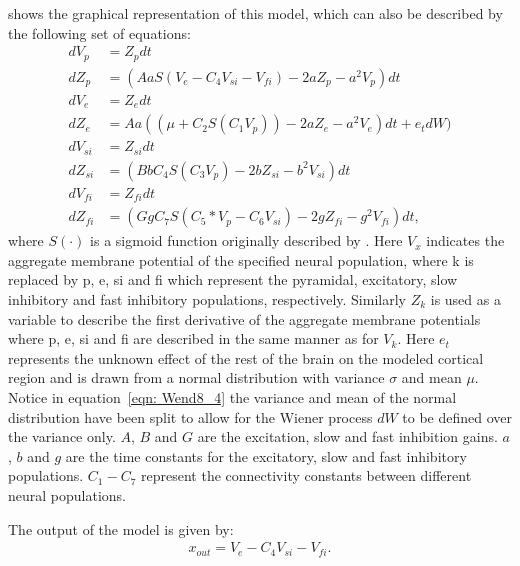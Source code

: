  shows the graphical representation of this model, which can also be described by the following set of equations: \begin{align}
dV_{p}&= Z_{p}dt\\
dZ_{p}&=(AaS(V_{e}-C_{4}V_{si}-V_{fi})-2aZ_{p}-a^{2}V_{p})dt\\
dV_{e}&= Z_{e}dt\\
\label{eqn: Wend8_4}
dZ_{e}&=Aa((\mu +C_{2}S(C_{1}V_{p}))-2aZ_{e}-a^{2}V_{e})dt + e_{t}dW)\\
dV_{si}&= Z_{si}dt\\
dZ_{si}&=(BbC_{4}S(C_{3}V_{p})-2bZ_{si}-b^{2}V_{si})dt\\
dV_{fi}&= Z_{fi}dt\\
\label{eqn: model_simplified8}
dZ_{fi}&=(GgC_{7}S(C_{5}*V_{p}-C_{6}V_{si})-2gZ_{fi}-g^{2}V_{fi})dt,
\end{align} where $S(\cdot)$ is a sigmoid function originally described by . Here $V_{x}$ indicates the aggregate membrane potential of the specified neural population, where k is replaced by p, e, si and fi which represent the pyramidal, excitatory, slow inhibitory and fast inhibitory populations, respectively. Similarly $Z_{k}$ is used as a variable to describe the first derivative of the aggregate membrane potentials where p, e, si and fi are described in the same manner as for $V_{k}$. Here $e_{t}$ represents the unknown effect of the rest of the brain on the modeled cortical region and is drawn from a normal distribution with variance $\sigma$ and mean $\mu$. Notice in equation~\ref{eqn: Wend8_4} the variance and mean of the normal distribution have been split to allow for the Wiener process $dW$ to be defined over the variance only. $A$, $B$ and $G$ are the excitation, slow and fast inhibition gains. $a$, $b$ and $g$ are the time constants for the excitatory, slow and fast inhibitory populations. $C_{1}-C_{7}$ represent the connectivity constants between different neural populations. 


The output of the model is given by:\begin{align}
\label{eqn: WendlingOut}
x_{out} = V_{e}-C_{4}V_{si}-V_{fi}.
\end{align} 

